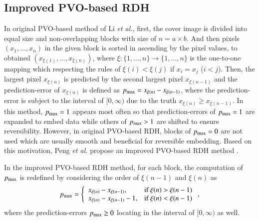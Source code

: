\documentclass[review,3p,10pt,sort&compress]{elsarticle}
\begin{document}
\subsection{Improved PVO-based RDH \cite{Peng2014IPVO}}\label{sec:2.1}
In original PVO-based method \cite{Li2013PVO} of Li \emph{et al.}, first, the cover image is divided into equal size and non-overlapping blocks with size of $n = a \times b$. And then pixels $(x_{1},...,x_{n})$ in the given block is sorted in ascending by the pixel values, to obtained $(x_{\xi(1)},...,x_{\xi(n)})$, where $\xi : \{1,...,n\} \rightarrow \{1,...,n\}$ is the one-to-one mapping which respecting the rules of $\xi(i) < \xi(j)$ if $x_{i} = x_{j}$ ($i < j$). Then, the largest pixel $x_{\xi(n)}$ is predicted by the second largest pixel $x_{\xi(n-1)}$ and the prediction-error of $x_{\xi(n)}$ is defined as $p_{\rm max} = x_{\xi(n)} - x_{\xi(n-1)}$, where the prediction-error is subject to the interval of $[0, \infty)$ due to the truth $x_{\xi(n)} \geq x_{\xi(n-1)}$. In this method, $p_{\rm max} = 1$ appears  most often so that prediction-errors of $p_{\rm max} = 1$ are expanded to embed data while others of $p_{\rm max} > 1$
are shifted to ensure reversibility. However, in original PVO-based RDH, blocks of $p_{\rm max} = 0$ are not used which are usually smooth and beneficial for reversible embedding. Based on this motivation, Peng \emph{et al.} propose an improved PVO-based RDH method \cite{Peng2014IPVO}.

In the improved PVO-based RDH method, for each block, the computation of $p_{\rm max}$ is redefined by considering the order of $\xi(n-1)$ and $\xi(n)$ as
\begin{equation}\label{eq:pmax}
p_{\rm max} = \left\{\begin{array}{ll}
x_{\xi(n)} - x_{\xi(n-1)},      & \text{if } \xi(n) > \xi(n-1) \\
x_{\xi(n)} - x_{\xi(n-1)} - 1,  & \text{if } \xi(n) < \xi(n-1)
\end{array}\right.,
\end{equation}
where the prediction-errors $p_{\rm max} \geq 0$ locating in the interval of $[0, \infty)$ as well.
\end{document}

